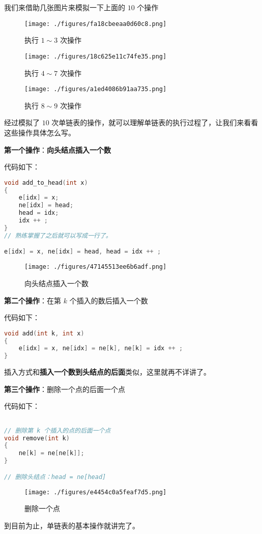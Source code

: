我们来借助几张图片来模拟一下上面的 $10$ 个操作

\begin{figure}[ht]
\centering
\texttt{[image: ./figures/fa18cbeeaa0d60c8.png]}
\caption{执行 $1\sim3$ 次操作} \label{fig_List_2}
\end{figure}

\begin{figure}[ht]
\centering
\texttt{[image: ./figures/18c625e11c74fe35.png]}
\caption{执行 $4\sim7$ 次操作} \label{fig_List_3}
\end{figure}

\begin{figure}[ht]
\centering
\texttt{[image: ./figures/a1ed4086b91aa735.png]}
\caption{执行 $8\sim9$ 次操作} \label{fig_List_4}
\end{figure}

经过模拟了 $10$ 次单链表的操作，就可以理解单链表的执行过程了，让我们来看看这些操作具体怎么写。

\textbf{第一个操作}：\textbf{向头结点插入一个数}

代码如下：

\begin{lstlisting}[language=cpp]
void add_to_head(int x) 
{
    e[idx] = x;
    ne[idx] = head;
    head = idx;
    idx ++ ;
}
// 熟练掌握了之后就可以写成一行了。

e[idx] = x, ne[idx] = head, head = idx ++ ;
\end{lstlisting}

\begin{figure}[ht]
\centering
\texttt{[image: ./figures/47145513ee6b6adf.png]}
\caption{向头结点插入一个数} \label{fig_List_5}
\end{figure}



\textbf{第二个操作}：在第 $k$ 个插入的数后插入一个数


代码如下：

\begin{lstlisting}[language=cpp]
void add(int k, int x)
{
    e[idx] = x, ne[idx] = ne[k], ne[k] = idx ++ ;
}
\end{lstlisting}

插入方式和\textbf{插入一个数到头结点的后面}类似，这里就再不详讲了。

\textbf{第三个操作}：删除一个点的后面一个点

代码如下：

\begin{lstlisting}[language=cpp]

// 删除第 k 个插入的点的后面一个点
void remove(int k)
{
    ne[k] = ne[ne[k]];
}

// 删除头结点：head = ne[head]
\end{lstlisting}

\begin{figure}[ht]
\centering
\texttt{[image: ./figures/e4454c0a5feaf7d5.png]}
\caption{删除一个点} \label{fig_List_6}
\end{figure}

到目前为止，单链表的基本操作就讲完了。